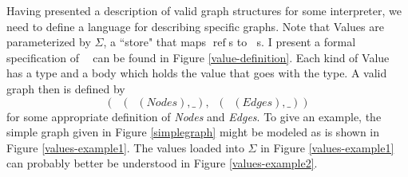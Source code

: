 \documentclass[12pt]{article}
\DeclareMathOperator{\ListT}{ListT_\Gamma}
\DeclareMathOperator{\Value}{Value_{\Gamma, \Sigma}}
\DeclareMathOperator{\ListV}{ListV_{\Gamma, \Sigma}}
\DeclareMathOperator{\textref}{ref}
\DeclareMathOperator{\where}{ where }
\newcommand{\ValueRef}{\textref}
\begin{document}
Having presented a description of valid graph structures for some
interpreter, we need to define a language for describing specific 
graphs. 
Note that Values are parameterized by \(\Sigma\), a ``store" that
maps \(\ValueRef\)s to \(\Value\)s. I present a formal specification of
\(\Value\) can be found in Figure \ref{value-definition}.
Each kind of Value has a type and a body which holds the value that 
goes with the type. 
A valid graph then is defined by 
\[(\ListV(\ListT(\textit{Nodes}), \_), \ListV(\ListT(\textit{Edges}), \_))\]
for some appropriate definition of \textit{Nodes} and \textit{Edges}.
To give an example, the simple graph given in Figure \ref{simplegraph} 
might be modeled as is shown in Figure \ref{values-example1}.
The values loaded into \(\Sigma\) in Figure \ref{values-example1} can probably 
better be understood in Figure \ref{values-example2}.

\newcommand{\newlinewhere}{\\&\quad\quad\where}
\end{document}
